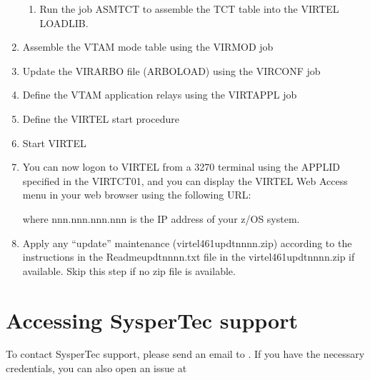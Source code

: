 \documentclass[letterpaper,10pt,english]{sphinxmanual}
\begin{document}
\begin{enumerate}
\begin{enumerate}
\item {} 
\sphinxAtStartPar
Run the job ASMTCT  to assemble the TCT table into the VIRTEL LOADLIB.

\end{enumerate}

\item {} 
\sphinxAtStartPar
Assemble the VTAM mode table using the VIRMOD job

\item {} 
\sphinxAtStartPar
Update the VIRARBO file (ARBOLOAD) using the VIRCONF job

\item {} 
\sphinxAtStartPar
Define the VTAM application relays using the VIRTAPPL job

\item {} 
\sphinxAtStartPar
Define the VIRTEL start procedure

\item {} 
\sphinxAtStartPar
Start VIRTEL

\item {} 
\sphinxAtStartPar
You can now logon to VIRTEL from a 3270 terminal using the APPLID specified in the VIRTCT01, and you can display the VIRTEL Web Access menu in your web browser using the following URL:
\begin{quote}

\sphinxAtStartPar
{}
\end{quote}

\sphinxAtStartPar
where nnn.nnn.nnn.nnn is the IP address of your z/OS system.

\item {} 
\sphinxAtStartPar
Apply any “update” maintenance (virtel461updtnnnn.zip) according to the instructions in the Readme\sphinxhyphen{}updtnnnn.txt file in the virtel461updtnnnn.zip if available. Skip this step if no zip file is available.

\end{enumerate}


\section{Accessing SysperTec support}
\label{\detokenize{Getting_Started:accessing-syspertec-support}}
\sphinxAtStartPar
To contact SysperTec support, please send an email to . If you have the necessary credentials, you can also open an issue at 
\end{document}
